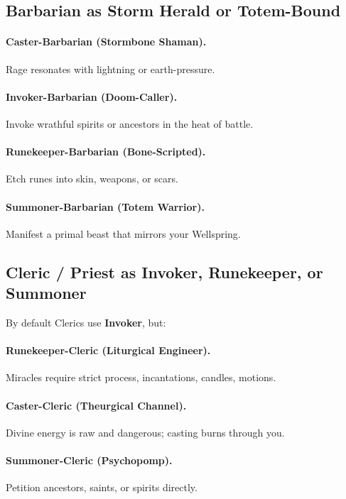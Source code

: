 \documentclass[11pt]{book}
\begin{document}
\subsection{Barbarian as Storm Herald or Totem-Bound}
\paragraph{Caster-Barbarian (Stormbone Shaman).}
Rage resonates with lightning or earth-pressure.

\paragraph{Invoker-Barbarian (Doom-Caller).}
Invoke wrathful spirits or ancestors in the heat of battle.

\paragraph{Runekeeper-Barbarian (Bone-Scripted).}
Etch runes into skin, weapons, or scars.

\paragraph{Summoner-Barbarian (Totem Warrior).}
Manifest a primal beast that mirrors your Wellspring.

\subsection{Cleric / Priest as Invoker, Runekeeper, or Summoner}
By default Clerics use \textbf{Invoker}, but:

\paragraph{Runekeeper-Cleric (Liturgical Engineer).}
Miracles require strict process, incantations, candles, motions.

\paragraph{Caster-Cleric (Theurgical Channel).}
Divine energy is raw and dangerous; casting burns through you.

\paragraph{Summoner-Cleric (Psychopomp).}
Petition ancestors, saints, or spirits directly.
\end{document}
